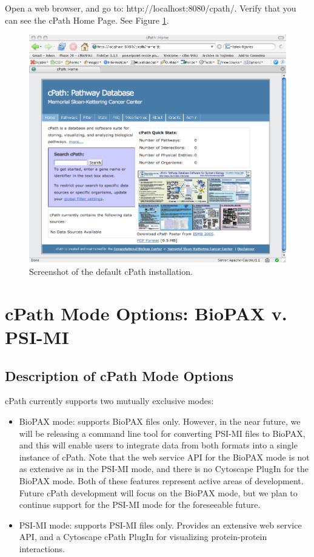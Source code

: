 \documentclass[letterpaper,12pt]{article}
\begin{document}
Open a web browser, and go to: http://localhost:8080/cpath/. Verify that you can see the cPath Home Page.  See Figure \ref{default-installation}.

\begin{figure}
  \includegraphics[scale=0.3]{figures/default_installation.png}
  \caption{Screenshot of the default cPath installation.}
\label{default-installation}
\end{figure}

\section{cPath Mode Options:  BioPAX v. PSI-MI}

\subsection{Description of cPath Mode Options}

cPath currently supports two mutually exclusive modes:  

\begin{itemize}

\item BioPAX mode: supports BioPAX files only.  However, in the near future, we will be releasing a command line tool for converting PSI-MI files to BioPAX, and this will enable users to integrate data from both formats into a single instance of cPath.  Note that the web service API for the BioPAX mode is not as extensive as in the PSI-MI mode, and there is no Cytoscape PlugIn for the BioPAX mode.  Both of these features represent active areas of development.  Future cPath development will focus on the BioPAX mode, but we plan to continue support for the PSI-MI mode for the foreseeable future.

\item PSI-MI mode: supports PSI-MI files only.  Provides an extensive web service API, and a Cytoscape cPath PlugIn for visualizing protein-protein interactions.

\end{itemize}
\end{document}
